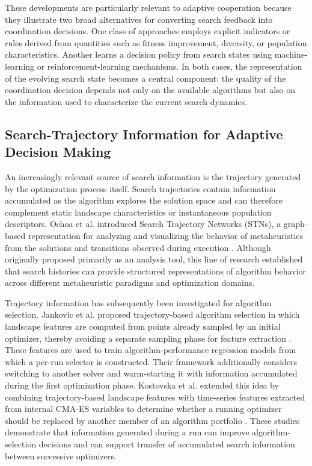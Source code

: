 \documentclass[review]{elsarticle}
\begin{document}
These developments are particularly relevant to adaptive cooperation because
they illustrate two broad alternatives for converting search feedback into
coordination decisions. One class of approaches employs explicit indicators
or rules derived from quantities such as fitness improvement, diversity, or
population characteristics. Another learns a decision policy from search
states using machine-learning or reinforcement-learning mechanisms. In both
cases, the representation of the evolving search state becomes a central
component: the quality of the coordination decision depends not only on the
available algorithms but also on the information used to characterize the
current search dynamics.


\subsection{Search-Trajectory Information for Adaptive Decision Making}
\label{subsec:trajectory_related}

An increasingly relevant source of search information is the trajectory
generated by the optimization process itself. Search trajectories contain
information accumulated as the algorithm explores the solution space and
can therefore complement static landscape characteristics or instantaneous
population descriptors. Ochoa et al. introduced Search Trajectory Networks
(STNs), a graph-based representation for analyzing and visualizing the
behavior of metaheuristics from the solutions and transitions observed
during execution \cite{ochoa2021search}. Although originally proposed primarily
as an analysis tool, this line of research established that search histories
can provide structured representations of algorithm behavior across
different metaheuristic paradigms and optimization domains.

Trajectory information has subsequently been investigated for algorithm
selection. Jankovic et al. proposed trajectory-based algorithm selection in
which landscape features are computed from points already sampled by an
initial optimizer, thereby avoiding a separate sampling phase for feature
extraction \cite{jankovic2022trajectory}. These features are used to train
algorithm-performance regression models from which a per-run selector is
constructed. Their framework additionally considers switching to another
solver and warm-starting it with information accumulated during the first
optimization phase. Kostovska et al. extended this idea by combining
trajectory-based landscape features with time-series features extracted
from internal CMA-ES variables to determine whether a running optimizer
should be replaced by another member of an algorithm portfolio
\cite{kostovska2022per}. These studies demonstrate that information
generated during a run can improve algorithm-selection decisions and can
support transfer of accumulated search information between successive
optimizers.
\end{document}
